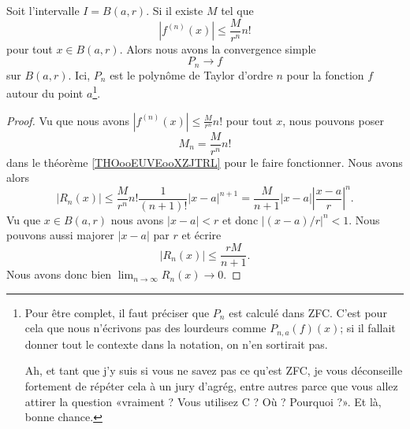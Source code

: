 \begin{proposition}
	Soit l'intervalle \( I=B(a,r)\). Si il existe \( M\) tel que
	\begin{equation}
		| f^{(n)}(x) |\leq \frac{ M }{ r^n }n!
	\end{equation}
	pour tout \( x\in B(a,r)\). Alors nous avons la convergence simple
	\begin{equation}
		P_n\to f
	\end{equation}
	sur \( B(a,r)\). Ici, \( P_n\) est le polynôme de Taylor d'ordre \( n\) pour la fonction \( f\) autour du point \( a\)\footnote{Pour être complet, il faut préciser que \( P_n\) est calculé dans ZFC. C'est pour cela que nous n'écrivons pas des lourdeurs comme \( P_{n,a}(f)(x)\); si il fallait donner tout le contexte dans la notation, on n'en sortirait pas.

		Ah, et tant que j'y suis si vous ne savez pas ce qu'est ZFC, je vous déconseille fortement de répéter cela à un jury d'agrég, entre autres parce que vous allez attirer la question «vraiment ? Vous utilisez C ? Où ? Pourquoi ?». Et là, bonne chance.}.
\end{proposition}

\begin{proof}
	Vu que nous avons \( | f^{(n)}(x) |\leq \frac{ M }{ r^n }n!\) pour tout \( x\), nous pouvons poser
	\begin{equation}
		M_n=\frac{ M }{ r^n }n!
	\end{equation}
	dans le théorème \ref{THOooEUVEooXZJTRL} pour le faire fonctionner. Nous avons alors
	\begin{equation}
		| R_n(x) |\leq \frac{ M }{ r^n }n!\frac{1}{ (n+1)! }| x-a |^{n+1}=\frac{ M }{ n+1 }| x-a |\left| \frac{ x-a }{ r } \right|^n.
	\end{equation}
	Vu que \( x\in B(a,r)\) nous avons \( | x-a |<r\) et donc \( |(x-a)/r |^n<1\). Nous pouvons aussi majorer \( | x-a |\) par \( r\) et écrire
	\begin{equation}
		| R_n(x) |\leq \frac{ rM }{ n+1 }.
	\end{equation}
	Nous avons donc bien \( \lim_{n\to \infty} R_n(x)\to 0\).
\end{proof}
